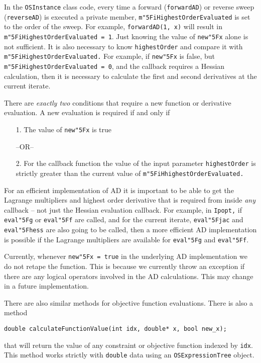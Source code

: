 \documentclass[11pt]{article}
\renewcommand{\_}{{\char"5F}}
\renewcommand{\{}{{\char"7B}}
\renewcommand{\}}{{\char"7D}}
\renewcommand{\^}{{\char"0D}}
\renewcommand{\'}{{\char"0D}}
\begin{document}
In the {\tt OSInstance} class code,  every time a forward ({\tt forwardAD}) or reverse sweep ({\tt reverseAD}) is executed a private  member, {\tt m\_iHighestOrderEvaluated}  is  set to the order of the sweep. For example, {\tt forwardAD(1, x)} will result in {\tt  m\_iHighestOrderEvaluated = 1}.  Just knowing the value  of  {\tt new\_x} alone is not sufficient. It is also necessary  to know {\tt highestOrder} and compare it with {\tt m\_iHighestOrderEvaluated.}  For example, if  {\tt new\_x}  is  false,  but {\tt m\_iHighestOrderEvaluated = 0},  and   the callback requires a Hessian calculation, then it is necessary to calculate the first and second derivatives at the current iterate. 

There are {\it  exactly two} conditions that  require a new function or derivative evaluation.   A new evaluation is required if and only if

\begin{itemize}
\item[1.]   The value of {\tt new\_x} is  true

\begin{center}
 --OR--
\end{center}


\item[2.] For the callback function the value of the input parameter {\tt highestOrder} is strictly greater than the current value  of    {\tt m\_iHhighestOrderEvaluated.} 
\end{itemize}

For an efficient implementation of AD it is important to be able to get the Lagrange multipliers and highest order derivative that is required from inside {\it any} callback -- not just the Hessian evaluation callback. For example, in {\tt Ipopt,} if  {\tt eval\_g}  or {\tt eval\_f} are called, and  for the current iterate, {\tt eval\_jac} and {\tt eval\_hess} are also going to be called, then  a more efficient AD implementation is possible if the Lagrange multipliers are available for {\tt eval\_g} and {\tt eval\_f}. 

Currently, whenever {\tt new\_x = true} in the underlying AD implementation we do not retape the function. This is because we currently throw an exception if there are any logical operators involved in the AD calculations. This may change in a future implementation.


There are also similar methods for objective function evaluations.  There is also a method
\begin{verbatim}
double calculateFunctionValue(int idx, double* x, bool new_x);
\end{verbatim}
that will return the value of any constraint or objective function indexed by {\tt idx}. This method works strictly with {\tt double} data using an {\tt OSExpressionTree} object.
\end{document}

